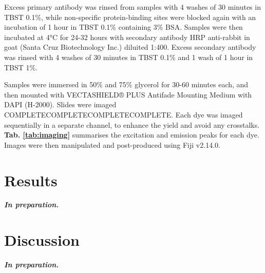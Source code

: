 Excess primary antibody was rinsed from samples with 4 washes of 30 minutes in TBST 0.1\%, while non-specific protein-binding sites were blocked again with an incubation of 1 hour in TBST 0.1\% containing 3\% BSA. Samples were then incubated at 4°C for 24-32 hours with secondary antibody HRP
anti-rabbit in goat (Santa Cruz Biotechnology Inc.) diluited 1:400. Excess secondary antibody was rinsed with 4 washes of 30 minutes in TBST 0.1\% and 1 wash of 1 hour in TBST 1\%.

Samples were immersed in 50\% and 75\% glycerol for 30-60 minutes each, and then mounted with VECTASHIELD® PLUS Antifade Mounting Medium with DAPI (H-2000). Slides were imaged COMPLETECOMPLETECOMPLETECOMPLETE. Each dye was imaged sequentially in a separate channel, to enhance the yield and avoid any crosstalks. \textbf{Tab. \ref{tab:imaging}} summarises the excitation and emission peaks for each dye. Images were then manipulated and post-produced using Fiji v2.14.0.

\section{Results} \label{chapter4_results}

\textbf{\textit{In preparation.}}

\section{Discussion} \label{chapter4_discussion}

\textbf{\textit{In preparation.}}

% 

